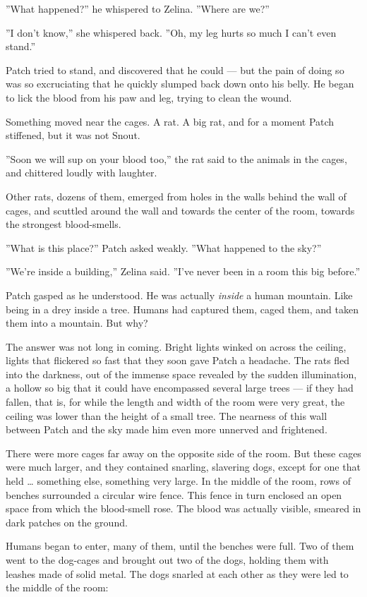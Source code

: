 \documentclass[12pt]{book}
\begin{document}
''What happened?'' he whispered to Zelina. ''Where are we?''

''I don't know,'' she whispered back. ''Oh, my leg hurts so much I
can't even stand.''

Patch tried to stand, and discovered that he could --- but the pain of
doing so was so excruciating that he quickly slumped back down onto
his belly. He began to lick the blood from his paw and leg, trying to
clean the wound.

Something moved near the cages. A rat. A big rat, and for a moment
Patch stiffened, but it was not Snout.

''Soon we will sup on your blood too,'' the rat said to the animals in
the cages, and chittered loudly with laughter.

Other rats, dozens of them, emerged from holes in the walls behind the
wall of cages, and scuttled around the wall and towards the center of
the room, towards the strongest blood-smells.

''What is this place?'' Patch asked weakly. ''What happened to the
sky?''

''We're inside a building,'' Zelina said. ''I've never been in a room
this big before.''

Patch gasped as he understood. He was actually \textit{inside} a human
mountain. Like being in a drey inside a tree. Humans had captured
them, caged them, and taken them into a mountain. But why?

The answer was not long in coming. Bright lights winked on across the
ceiling, lights that flickered so fast that they soon gave Patch a
headache. The rats fled into the darkness, out of the immense space
revealed by the sudden illumination, a hollow so big that it could
have encompassed several large trees --- if they had fallen, that is,
for while the length and width of the room were very great, the
ceiling was lower than the height of a small tree. The nearness of
this wall between Patch and the sky made him even more unnerved and
frightened.

There were more cages far away on the opposite side of the room. But
these cages were much larger, and they contained snarling, slavering
dogs, except for one that held \ldots{} something else, something very
large. In the middle of the room, rows of benches surrounded a
circular wire fence. This fence in turn enclosed an open space from
which the blood-smell rose. The blood was actually visible, smeared in
dark patches on the ground.

Humans began to enter, many of them, until the benches were full. Two
of them went to the dog-cages and brought out two of the dogs, holding
them with leashes made of solid metal. The dogs snarled at each other
as they were led to the middle of the room:
\end{document}

